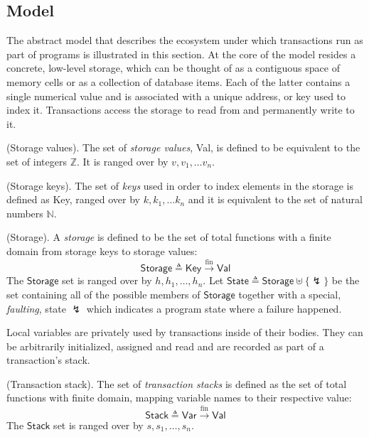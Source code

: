 \subsection{Model}

The abstract model that describes the ecosystem under which transactions run as part of programs is illustrated in this section. At the core of the model resides a concrete, low-level storage, which can be thought of as a contiguous space of memory cells or as a collection of database items. Each of the latter contains a single numerical value and is associated with a unique address, or key used to index it. Transactions access the storage to read from and permanently write to it.

\begin{defn}
	(Storage values).
	The set of \emph{storage values}, \textsf{Val}, is defined to be equivalent to the set of integers $\mathds{Z}$. It is ranged over by $v, v_1, \ldots v_n$.
\end{defn}

\begin{defn}
	(Storage keys).
	The set of \emph{keys} used in order to index elements in the storage is defined as \textsf{Key}, ranged over by $k, k_1, \ldots k_n$ and it is equivalent to the set of natural numbers $\mathds{N}$.
\end{defn}

\begin{defn}
	(Storage).
	A \emph{storage} is defined to be the set of total functions with a finite domain from storage keys to storage values:
	\[
		\mathsf{Storage} \triangleq \mathsf{Key} \xrightarrow{\text{fin}} \mathsf{Val}
	\]
	The $\mathsf{Storage}$ set is ranged over by $h, h_1, \ldots, h_n$. Let $\mathsf{State} \triangleq \mathsf{Storage} \uplus \{\lightning\}$ be the set containing all of the possible members of $\mathsf{Storage}$ together with a special, \textit{faulting}, state $\lightning$ which indicates a program state where a failure happened.	
\end{defn}

Local variables are privately used by transactions inside of their bodies. They can be arbitrarily initialized, assigned and read and are recorded as part of a transaction's stack.
\begin{defn}
	(Transaction stack).
	The set of \emph{transaction stacks} is defined as the set of total functions with finite domain, mapping variable names to their respective value:
	\[
		\mathsf{Stack} \triangleq \mathsf{Var} \xrightarrow{\text{fin}} \mathsf{Val}
	\]
	The $\mathsf{Stack}$ set is ranged over by $s, s_1, \ldots, s_n$.
\end{defn}

